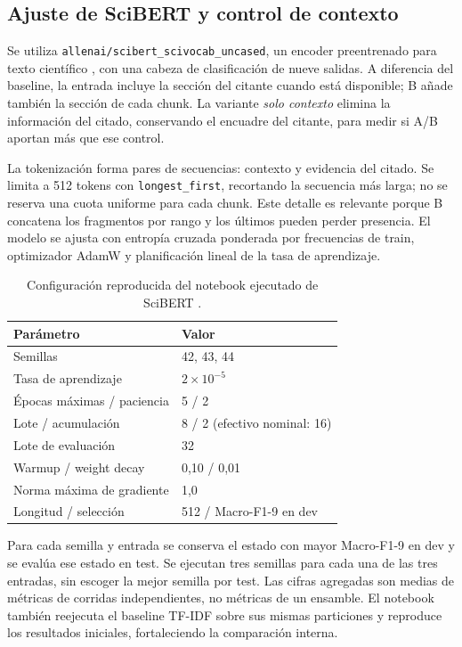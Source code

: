 \documentclass[10pt,a4paper,twocolumn]{article}
\begin{document}
\subsection{Ajuste de SciBERT y control de contexto}
Se utiliza \texttt{allenai/scibert\_scivocab\_uncased}, un encoder preentrenado para texto científico \cite{scibert}, con una cabeza de clasificación de nueve salidas. A diferencia del baseline, la entrada incluye la sección del citante cuando está disponible; B añade también la sección de cada chunk. La variante \emph{solo contexto} elimina la información del citado, conservando el encuadre del citante, para medir si A/B aportan más que ese control.

La tokenización forma pares de secuencias: contexto y evidencia del citado. Se limita a 512 tokens con \texttt{longest\_first}, recortando la secuencia más larga; no se reserva una cuota uniforme para cada chunk. Este detalle es relevante porque B concatena los fragmentos por rango y los últimos pueden perder presencia. El modelo se ajusta con entropía cruzada ponderada por frecuencias de train, optimizador AdamW y planificación lineal de la tasa de aprendizaje.

\begin{table}[t]
\centering\small
\caption{Configuración reproducida del notebook ejecutado de SciBERT \cite{repo}.}\label{tab:hp}
\begin{tabularx}{\columnwidth}{@{}lY@{}}\toprule
Parámetro & Valor\\\midrule
Semillas & 42, 43, 44\\
Tasa de aprendizaje & $2\times10^{-5}$\\
Épocas máximas / paciencia & 5 / 2\\
Lote / acumulación & 8 / 2 (efectivo nominal: 16)\\
Lote de evaluación & 32\\
Warmup / weight decay & 0,10 / 0,01\\
Norma máxima de gradiente & 1,0\\
Longitud / selección & 512 / Macro-F1-9 en dev\\\bottomrule
\end{tabularx}
\end{table}

Para cada semilla y entrada se conserva el estado con mayor Macro-F1-9 en dev y se evalúa ese estado en test. Se ejecutan tres semillas para cada una de las tres entradas, sin escoger la mejor semilla por test. Las cifras agregadas son medias de métricas de corridas independientes, no métricas de un ensamble. El notebook también reejecuta el baseline TF-IDF sobre sus mismas particiones y reproduce los resultados iniciales, fortaleciendo la comparación interna.
\end{document}
